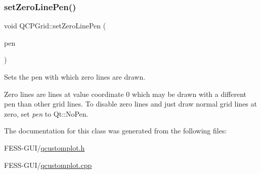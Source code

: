 \subsubsection{\texorpdfstring{set\+Zero\+Line\+Pen()}{setZeroLinePen()}}
{\footnotesize\ttfamily void Q\+C\+P\+Grid\+::set\+Zero\+Line\+Pen (\begin{DoxyParamCaption}\item[{const Q\+Pen \&}]{pen }\end{DoxyParamCaption})}

Sets the pen with which zero lines are drawn.

Zero lines are lines at value coordinate 0 which may be drawn with a different pen than other grid lines. To disable zero lines and just draw normal grid lines at zero, set {\itshape pen} to Qt\+::\+No\+Pen. 

The documentation for this class was generated from the following files\+:\begin{DoxyCompactItemize}
\item 
F\+E\+S\+S-\/\+G\+U\+I/\hyperlink{qcustomplot_8h}{qcustomplot.\+h}\item 
F\+E\+S\+S-\/\+G\+U\+I/\hyperlink{qcustomplot_8cpp}{qcustomplot.\+cpp}\end{DoxyCompactItemize}
